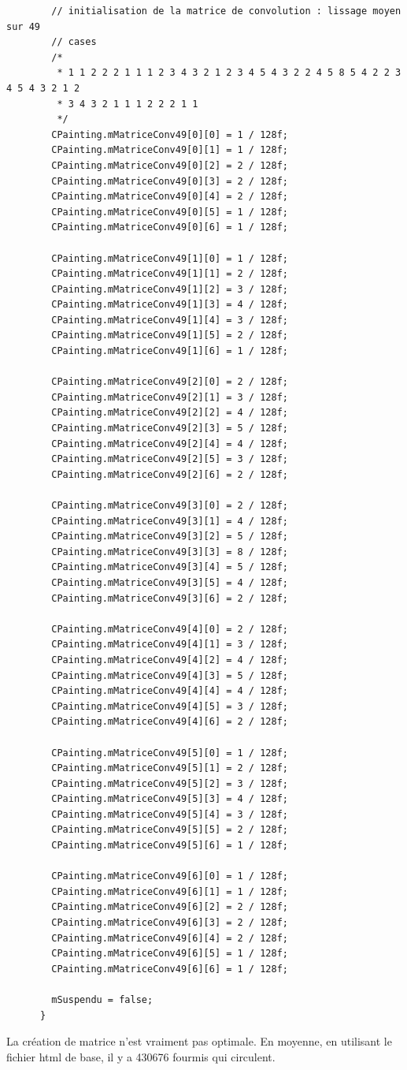 \documentclass[a4paper,12pt]{article}
\begin{document}
\begin{lstlisting}
        // initialisation de la matrice de convolution : lissage moyen sur 49
        // cases
        /*
         * 1 1 2 2 2 1 1 1 2 3 4 3 2 1 2 3 4 5 4 3 2 2 4 5 8 5 4 2 2 3 4 5 4 3 2 1 2
         * 3 4 3 2 1 1 1 2 2 2 1 1
         */
        CPainting.mMatriceConv49[0][0] = 1 / 128f;
        CPainting.mMatriceConv49[0][1] = 1 / 128f;
        CPainting.mMatriceConv49[0][2] = 2 / 128f;
        CPainting.mMatriceConv49[0][3] = 2 / 128f;
        CPainting.mMatriceConv49[0][4] = 2 / 128f;
        CPainting.mMatriceConv49[0][5] = 1 / 128f;
        CPainting.mMatriceConv49[0][6] = 1 / 128f;
    
        CPainting.mMatriceConv49[1][0] = 1 / 128f;
        CPainting.mMatriceConv49[1][1] = 2 / 128f;
        CPainting.mMatriceConv49[1][2] = 3 / 128f;
        CPainting.mMatriceConv49[1][3] = 4 / 128f;
        CPainting.mMatriceConv49[1][4] = 3 / 128f;
        CPainting.mMatriceConv49[1][5] = 2 / 128f;
        CPainting.mMatriceConv49[1][6] = 1 / 128f;
    
        CPainting.mMatriceConv49[2][0] = 2 / 128f;
        CPainting.mMatriceConv49[2][1] = 3 / 128f;
        CPainting.mMatriceConv49[2][2] = 4 / 128f;
        CPainting.mMatriceConv49[2][3] = 5 / 128f;
        CPainting.mMatriceConv49[2][4] = 4 / 128f;
        CPainting.mMatriceConv49[2][5] = 3 / 128f;
        CPainting.mMatriceConv49[2][6] = 2 / 128f;
    
        CPainting.mMatriceConv49[3][0] = 2 / 128f;
        CPainting.mMatriceConv49[3][1] = 4 / 128f;
        CPainting.mMatriceConv49[3][2] = 5 / 128f;
        CPainting.mMatriceConv49[3][3] = 8 / 128f;
        CPainting.mMatriceConv49[3][4] = 5 / 128f;
        CPainting.mMatriceConv49[3][5] = 4 / 128f;
        CPainting.mMatriceConv49[3][6] = 2 / 128f;
    
        CPainting.mMatriceConv49[4][0] = 2 / 128f;
        CPainting.mMatriceConv49[4][1] = 3 / 128f;
        CPainting.mMatriceConv49[4][2] = 4 / 128f;
        CPainting.mMatriceConv49[4][3] = 5 / 128f;
        CPainting.mMatriceConv49[4][4] = 4 / 128f;
        CPainting.mMatriceConv49[4][5] = 3 / 128f;
        CPainting.mMatriceConv49[4][6] = 2 / 128f;
    
        CPainting.mMatriceConv49[5][0] = 1 / 128f;
        CPainting.mMatriceConv49[5][1] = 2 / 128f;
        CPainting.mMatriceConv49[5][2] = 3 / 128f;
        CPainting.mMatriceConv49[5][3] = 4 / 128f;
        CPainting.mMatriceConv49[5][4] = 3 / 128f;
        CPainting.mMatriceConv49[5][5] = 2 / 128f;
        CPainting.mMatriceConv49[5][6] = 1 / 128f;
    
        CPainting.mMatriceConv49[6][0] = 1 / 128f;
        CPainting.mMatriceConv49[6][1] = 1 / 128f;
        CPainting.mMatriceConv49[6][2] = 2 / 128f;
        CPainting.mMatriceConv49[6][3] = 2 / 128f;
        CPainting.mMatriceConv49[6][4] = 2 / 128f;
        CPainting.mMatriceConv49[6][5] = 1 / 128f;
        CPainting.mMatriceConv49[6][6] = 1 / 128f;
    
        mSuspendu = false;
      }
\end{lstlisting}
La création de matrice n'est vraiment pas optimale. En moyenne, en utilisant le fichier html de base, il y a 430676 fourmis qui circulent. 
\end{document}

